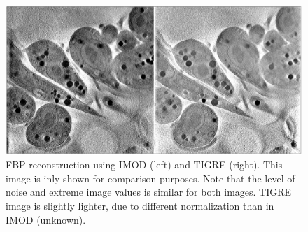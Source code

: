 \documentclass[11pt]{report}
\begin{document}
\begin{figure}
\begin{center}

\includegraphics[width=\textwidth]{TIGREvsIMOD.png} 
\end{center}

\caption{\label{fig:TIGREvsIMOD}FBP reconstruction using IMOD (left) and TIGRE (right). This image is inly shown for comparison purposes. Note that the level of noise and extreme image values is similar for both images. TIGRE image is slightly lighter,  due to different normalization than in IMOD (unknown).} 
\end{figure}
\end{document}

